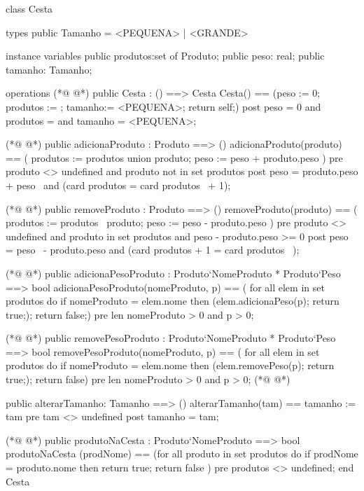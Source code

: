 \begin{vdmpp}[breaklines=true]
class Cesta

types
 public Tamanho = <PEQUENA> | <GRANDE>

instance variables
 public produtos:set of Produto;
  public peso: real;
 public tamanho: Tamanho;
 
operations
(*@
\label{Cesta:12}
@*)
  public  Cesta : () ==> Cesta
  Cesta() == (peso := 0; produtos := {}; tamanho:= <PEQUENA>; return self;)
  post peso = 0 and produtos = {} and tamanho = <PEQUENA>;
  
(*@
\label{adicionaProduto:16}
@*)
  public  adicionaProduto : Produto ==> ()
  adicionaProduto(produto) == 
  (
   produtos := produtos union {produto};
    peso := peso + produto.peso
  )
  pre produto <> undefined and produto not in set produtos 
  post peso = produto.peso + peso~ and (card produtos = card produtos~ + 1);  
 
(*@
\label{removeProduto:25}
@*)
  public  removeProduto : Produto ==> ()
  removeProduto(produto) ==
  ( 
   produtos := produtos \ {produto};
   peso := peso - produto.peso
  )
  pre produto <> undefined and produto in set produtos and peso - produto.peso >= 0
  post peso = peso~ - produto.peso and (card produtos + 1  = card produtos~ ); 

(*@
\label{adicionaPesoProduto:34}
@*)
  public  adicionaPesoProduto : Produto`NomeProduto * Produto`Peso ==> bool
  adicionaPesoProduto(nomeProduto, p) ==
 ( for all elem in set produtos
   do 
   if nomeProduto = elem.nome
    then (elem.adicionaPeso(p); return true;);
 return false;)
 pre len nomeProduto > 0 and p > 0; 
 
(*@
\label{removePesoProduto:43}
@*)
 public  removePesoProduto : Produto`NomeProduto * Produto`Peso ==> bool
  removePesoProduto(nomeProduto, p) == 
  ( for all elem in set produtos
    do
     if nomeProduto = elem.nome
      then (elem.removePeso(p); return true;);
  return false)
  pre len nomeProduto > 0 and p > 0;
(*@
\label{alterarTamanho:51}
@*)
  
  public alterarTamanho: Tamanho ==> ()
  alterarTamanho(tam)  == 
    tamanho := tam
  pre tam <> undefined
  post tamanho = tam; 
  
(*@
\label{produtoNaCesta:58}
@*)
  public produtoNaCesta : Produto`NomeProduto ==> bool
  produtoNaCesta (prodNome) == 
   (for all produto in set produtos
    do 
     if prodNome = produto.nome
       then return true;
    return false
   )
   pre produtos <> undefined; 
end Cesta
\end{vdmpp}
